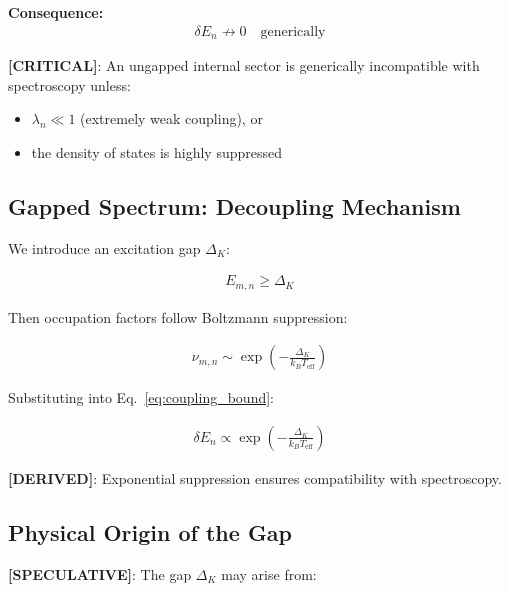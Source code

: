 \documentclass[11pt]{article}
\theoremstyle{definition}
\theoremstyle{plain}
\theoremstyle{remark}
\begin{document}
        \textbf{Consequence:}
        \begin{align}
            \delta E_n \not\to 0 \quad \text{generically}
        \end{align}
        
        \textbf{[CRITICAL]}:
        An ungapped internal sector is generically incompatible with spectroscopy unless:
        
        \begin{itemize}
            \item $\lambda_n \ll 1$ (extremely weak coupling), or
            \item the density of states is highly suppressed
        \end{itemize}
    
    \subsection{Gapped Spectrum: Decoupling Mechanism}
        
        We introduce an excitation gap $\Delta_K$:
        
        \begin{align}
            E_{m,n} \geq \Delta_K
        \end{align}
        
        Then occupation factors follow Boltzmann suppression:
        
        \begin{align}
            \nu_{m,n} \sim \exp\left(-\frac{\Delta_K}{k_B T_{\text{eff}}}\right)
        \end{align}
        
        Substituting into Eq.~\ref{eq:coupling_bound}:
        
        \begin{align}
            \delta E_n \propto \exp\left(-\frac{\Delta_K}{k_B T_{\text{eff}}}\right)
            \label{eq:boltzmann_suppression}
        \end{align}
        
        \textbf{[DERIVED]}:
        Exponential suppression ensures compatibility with spectroscopy.
    
    \subsection{Physical Origin of the Gap}
        
        \textbf{[SPECULATIVE]}:
        The gap $\Delta_K$ may arise from:
        
\end{document}
